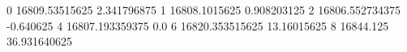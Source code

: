 0 16809.53515625 2.341796875
1 16808.1015625 0.908203125
2 16806.552734375 -0.640625
4 16807.193359375 0.0
6 16820.353515625 13.16015625
8 16844.125 36.931640625
